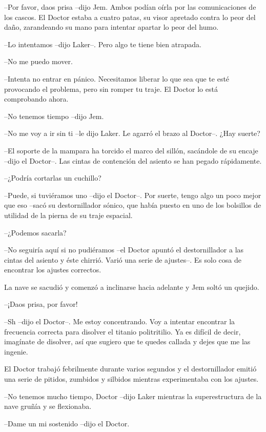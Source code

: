{--Por favor, daos prisa --dijo Jem. Ambos podían oírla por las
 comunicaciones de los cascos. El Doctor estaba a cuatro patas, su visor
 apretado contra lo peor del daño, zarandeando su mano para intentar
apartar lo peor del humo.}

{--Lo intentamos --dijo Laker--. Pero algo te tiene bien atrapada.}

{--No me puedo mover.}

{--Intenta no entrar en pánico. Necesitamos liberar lo que sea que te
 esté provocando el problema, pero sin romper tu traje. El Doctor lo está
comprobando ahora.}

{--No tenemos tiempo --dijo Jem.}

{--No me voy a ir sin ti --le dijo Laker. Le agarró el brazo al Doctor--.
¿Hay suerte?}

{--El soporte de la mampara ha torcido el marco del sillón, sacándole de
 su encaje --dijo el Doctor--. Las cintas de contención del asiento se
han pegado rápidamente.}

{--¿Podría cortarlas un cuchillo?}

{--Puede, si tuviéramos uno --dijo el Doctor--. Por suerte, tengo algo un
 poco mejor que eso --sacó su destornillador sónico, que había puesto en
uno de los bolsillos de utilidad de la pierna de su traje espacial.}

{--¿Podemos sacarla?}

{--No seguiría aquí si no pudiéramos --el Doctor apuntó el destornillador
 a las cintas del asiento y éste chirrió. Varió una serie de ajustes--.
Es solo cosa de encontrar los ajustes correctos.}

{La nave se sacudió y comenzó a inclinarse hacia adelante y Jem soltó un
quejido.}

{--¡Daos prisa, por favor!}

{--Sh --dijo el Doctor--. Me estoy concentrando. Voy a intentar encontrar
 la frecuencia correcta para disolver el titanio politritilio. Ya es
 difícil de decir, imagínate de disolver, así que sugiero que te quedes
callada y dejes que me las ingenie.}

{El Doctor trabajó febrilmente durante varios segundos y el
 destornillador emitió una serie de pitidos, zumbidos y silbidos mientras
experimentaba con los ajustes.}

{--No tenemos mucho tiempo, Doctor --dijo Laker mientras la
superestructura de la nave gruñía y se flexionaba.}

{--Dame un mi sostenido --dijo el Doctor.}


